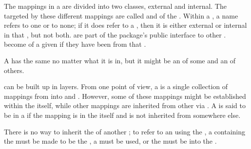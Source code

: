 \endsubsubsection%



The mappings in a  are divided into two classes, external and internal.
The  targeted by these different mappings 
are called  and  of the
. Within a , a name refers to one
 or to none; if it does refer
to a , then it is either external or internal in that
, but not both.
are part of the package's public interface to other .
 become  of a given
 if they have been  from that .

A  has the same  no matter what  
it is  in, but it might be an  of some 
and an  of others. 

\endsubsubsubsection%


 can be built up in layers.  From one point of view,
a  is a single collection
of mappings from  into  and 
.
However, some of these mappings might be established within the  
itself, while other mappings are inherited from other  
via .
A  is said to be  in a  
if the mapping is in the  itself and is
not inherited from somewhere else.

There is no way to inherit the  of another ;
to refer to an  using the , 
    a  containing the  
     must be made to be the ,
    a  must be used,
 or the  must be  into the .

\endsubsubsubsection%


